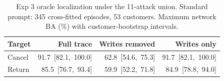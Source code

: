 \begin{table}[t]\centering\footnotesize\setlength{\tabcolsep}{2pt}
\caption{Exp 3 oracle localization under the 11-attack union. Standard prompt: 345 cross-fitted episodes, 53 customers. Maximum network BA (\%) with customer-bootstrap intervals.}\label{tab:r7-e12}
\begin{tabular}{@{}lrrr@{}}\toprule
Target & Full trace & Writes removed & Writes only\\\midrule
Cancel & \mbox{91.7 [82.1, 100.0]} & \mbox{62.8 [54.6, 75.3]} & \mbox{91.7 [82.1, 100.0]}\\
Return & \mbox{85.5 [76.7, 93.4]} & \mbox{59.9 [52.2, 71.8]} & \mbox{84.9 [78.8, 94.0]}\\
\bottomrule\end{tabular}\end{table}
